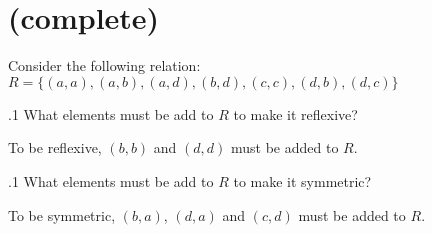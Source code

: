 \documentclass[12pt]{article}
\newenvironment{problem}[2][Problem]{\begin{trivlist}
\item[\hskip \labelsep {\bfseries #1}\hskip \labelsep {\bfseries #2.}]}{\end{trivlist}}
\begin{document}
\section{(complete)}
\begin{problem}1
	Consider the following relation:\\
	$R = \{(a,a),(a,b),(a,d),(b,d),(c,c),(d,b),(d,c)\}$
\end{problem}
\begin{problem}1.1
 What elements must be add to $R$ to make it reflexive?
\end{problem}
To be reflexive, $(b,b)$ and $(d,d)$ must be added to $R$.
\begin{problem}1.1
 What elements must be add to $R$ to make it symmetric?
\end{problem}
To be symmetric, $(b,a)$, $(d,a)$ and $(c,d)$ must be added to $R$.



 
\end{document}
